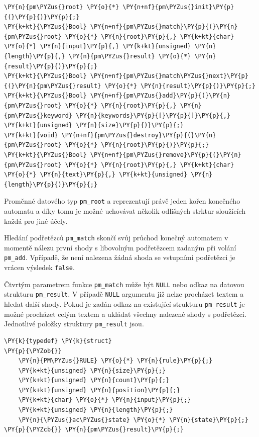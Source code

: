 \begin{Verbatim}[commandchars=\\\{\}]
\PY{n}{pm\PYZus{}root} \PY{o}{*} \PY{n+nf}{pm\PYZus{}init}\PY{p}{(}\PY{p}{)}\PY{p}{;}
\PY{k+kt}{\PYZus{}Bool} \PY{n+nf}{pm\PYZus{}match}\PY{p}{(}\PY{n}{pm\PYZus{}root} \PY{o}{*} \PY{n}{root}\PY{p}{,} \PY{k+kt}{char} \PY{o}{*} \PY{n}{input}\PY{p}{,} \PY{k+kt}{unsigned} \PY{n}{length}\PY{p}{,} \PY{n}{pm\PYZus{}result} \PY{o}{*} \PY{n}{result}\PY{p}{)}\PY{p}{;}
\PY{k+kt}{\PYZus{}Bool} \PY{n+nf}{pm\PYZus{}match\PYZus{}next}\PY{p}{(}\PY{n}{pm\PYZus{}result} \PY{o}{*} \PY{n}{result}\PY{p}{)}\PY{p}{;}
\PY{k+kt}{\PYZus{}Bool} \PY{n+nf}{pm\PYZus{}add}\PY{p}{(}\PY{n}{pm\PYZus{}root} \PY{o}{*} \PY{n}{root}\PY{p}{,} \PY{n}{pm\PYZus{}keyword} \PY{n}{keywords}\PY{p}{[}\PY{p}{]}\PY{p}{,} \PY{k+kt}{unsigned} \PY{n}{size}\PY{p}{)}\PY{p}{;}
\PY{k+kt}{void} \PY{n+nf}{pm\PYZus{}destroy}\PY{p}{(}\PY{n}{pm\PYZus{}root} \PY{o}{*} \PY{n}{root}\PY{p}{)}\PY{p}{;}
\PY{k+kt}{\PYZus{}Bool} \PY{n+nf}{pm\PYZus{}remove}\PY{p}{(}\PY{n}{pm\PYZus{}root} \PY{o}{*} \PY{n}{root}\PY{p}{,} \PY{k+kt}{char} \PY{o}{*} \PY{n}{text}\PY{p}{,} \PY{k+kt}{unsigned} \PY{n}{length}\PY{p}{)}\PY{p}{;}
\end{Verbatim}

Proměnné datového typ \texttt{pm\_root} a reprezentují právě jeden kořen konečného automatu a
díky tomu je možné uchovávat několik odlišných strktur sloužících každá pro jiné účely.

Hledání podřetězců \texttt{pm\_match} skončí svůj průchod konečný automatem v momentě nálezu první shody
s libovolným podřetězcem zadaným při volání \texttt{pm\_add}. Vpřípadě, že není nalezena žádná shoda
se vstupními podřetězci je vrácen výsledek \texttt{false}.

Čtvrtým parametrem funkce \texttt{pm\_match} může být \texttt{NULL} nebo odkaz na datovou strukturu
\texttt{pm\_result}. V případě \texttt{NULL} argumentu již nelze procházet textem a hledat další shody.
Pokud je zadán odkaz na existující strukturu \texttt{pm\_result} je možné procházet celým textem a ukládat
všechny nalezené shody s podřetězci. Jednotlivé položky struktury \texttt{pm\_result} jsou.

\begin{Verbatim}[commandchars=\\\{\}]
\PY{k}{typedef} \PY{k}{struct}
\PY{p}{\PYZob{}}
	\PY{n}{PM\PYZus{}RULE} \PY{o}{*} \PY{n}{rule}\PY{p}{;}
	\PY{k+kt}{unsigned} \PY{n}{size}\PY{p}{;}
	\PY{k+kt}{unsigned} \PY{n}{count}\PY{p}{;}
	\PY{k+kt}{unsigned} \PY{n}{position}\PY{p}{;}
	\PY{k+kt}{char} \PY{o}{*} \PY{n}{input}\PY{p}{;}
	\PY{k+kt}{unsigned} \PY{n}{length}\PY{p}{;}
	\PY{n}{\PYZus{}ac\PYZus{}state} \PY{o}{*} \PY{n}{state}\PY{p}{;}
\PY{p}{\PYZcb{}} \PY{n}{pm\PYZus{}result}\PY{p}{;}
\end{Verbatim}

